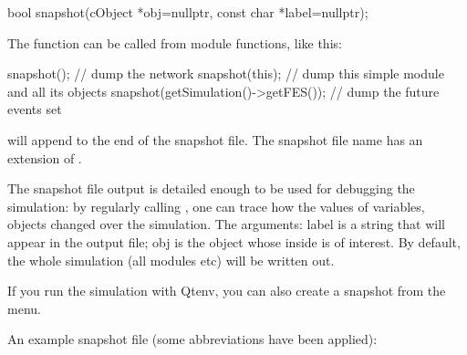 \begin{cpp}
bool snapshot(cObject *obj=nullptr, const char *label=nullptr);
\end{cpp}

The function can be called from module functions, like this:

\begin{cpp}
snapshot();     // dump the network
snapshot(this); // dump this simple module and all its objects
snapshot(getSimulation()->getFES()); // dump the future events set
\end{cpp}

 will append to the end of the snapshot file. The snapshot
file name has an extension of .

The snapshot file output is detailed enough to be used for debugging
the simulation: by regularly calling , one can trace
how the values of variables, objects changed over the simulation.
The arguments: label is a string that will appear in the output
file; obj is the object whose inside is of interest. By default,
the whole simulation (all modules etc) will be written out.

If you run the simulation with Qtenv, you can also create a
snapshot from the menu.

An example snapshot file (some abbreviations have been applied):

